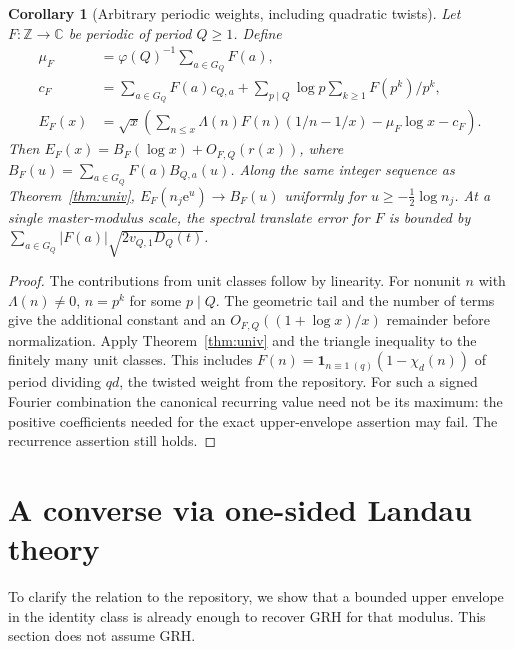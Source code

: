 \documentclass[11pt]{article}
\newtheorem{corollary}[theorem]{Corollary}
\theoremstyle{remark}\newtheorem{remark}[theorem]{Remark}
\newcommand{\e}{\mathrm{e}}
\begin{document}
\begin{corollary}[Arbitrary periodic weights, including quadratic twists]\label{cor:periodic}
Let $F:\mathbb Z\to\mathbb C$ be periodic of period $Q\ge1$. Define
\begin{align*}
 \mu_F&=\varphi(Q)^{-1}\sum_{a\in G_Q}F(a),\\
 c_F&=\sum_{a\in G_Q}F(a)c_{Q,a}
      +\sum_{p\mid Q}\log p\sum_{k\ge1}F(p^k)/p^k,\\
 E_F(x)&=\sqrt{x}\left(\sum_{n\le x}\Lambda(n)F(n)(1/n-1/x)-\mu_F\log x-c_F\right).
\end{align*}
Then $E_F(x)=B_F(\log x)+O_{F,Q}(r(x))$, where $B_F(u)=\sum_{a\in G_Q}F(a)B_{Q,a}(u)$. Along the same integer sequence as Theorem~\ref{thm:univ}, $E_F(n_j\e^u)\to B_F(u)$ uniformly for $u\ge-\tfrac12\log n_j$. At a single master-modulus scale, the spectral translate error for $F$ is bounded by $\sum_{a\in G_Q}|F(a)|\sqrt{2v_{Q,1}D_Q(t)}$.
\end{corollary}
\begin{proof}
The contributions from unit classes follow by linearity. For nonunit $n$ with $\Lambda(n)\ne0$, $n=p^k$ for some $p\mid Q$. The geometric tail and the number of terms give the additional constant and an $O_{F,Q}((1+\log x)/x)$ remainder before normalization. Apply Theorem~\ref{thm:univ} and the triangle inequality to the finitely many unit classes. This includes $F(n)=\mathbf1_{n\equiv1\ (q)}(1-\chi_d(n))$ of period dividing $qd$, the twisted weight from the repository. For such a signed Fourier combination the canonical recurring value need not be its maximum: the positive coefficients needed for the exact upper-envelope assertion may fail. The recurrence assertion still holds.
\end{proof}

\section{A converse via one-sided Landau theory}
To clarify the relation to the repository, we show that a bounded upper envelope in the identity class is already enough to recover GRH for that modulus. This section does not assume GRH.
\end{document}
